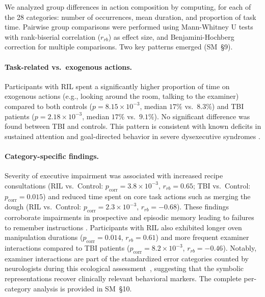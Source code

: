 \documentclass[runningheads]{llncs}
\begin{document}
    We analyzed group differences in action composition by computing, for each of the 28 categories: number of occurrences, mean duration, and proportion of task time. Pairwise group comparisons were performed using Mann-Whitney U tests with rank-biserial correlation ($r_{rb}$) as effect size, and Benjamini-Hochberg correction for multiple comparisons. Two key patterns emerged (SM~\S9).

    \paragraph{Task-related vs.\ exogenous actions.} Participants with RIL spent a significantly higher proportion of time on exogenous actions (e.g., looking around the room, talking to the examiner) compared to both controls ($p=8.15\times10^{-3}$, median $17\%$ vs.\ $8.3\%$) and TBI patients ($p=2.18\times10^{-3}$, median $17\%$ vs.\ $9.1\%$). No significant difference was found between TBI and controls. This pattern is consistent with known deficits in sustained attention and goal-directed behavior in severe dysexecutive syndromes \cite{Hendry2016sh}.

    \paragraph{Category-specific findings.} Severity of executive impairment was associated with increased recipe consultations (RIL vs.\ Control: $p_{\text{corr}}=3.8\times10^{-3}$, $r_{rb}=0.65$; TBI vs.\ Control: $p_{\text{corr}}=0.015$) and reduced time spent on core task actions such as merging the dough (RIL vs.\ Control: $p_{\text{corr}}=2.3\times10^{-3}$, $r_{rb}=-0.68$). These findings corroborate impairments in prospective and episodic memory leading to failures to remember instructions \cite{Hendry2016sh,Chevignard2008}. Participants with RIL also exhibited longer oven manipulation durations ($p_{\text{corr}}=0.014$, $r_{rb}=0.61$) and more frequent examiner interactions compared to TBI patients ($p_{\text{corr}}=8.2\times10^{-3}$, $r_{rb}=-0.46$). Notably, examiner interactions are part of the standardized error categories counted by neurologists during this ecological assessment~\cite{Chevignard2008}, suggesting that the symbolic representations recover clinically relevant behavioral markers. The complete per-category analysis is provided in SM~\S10.

\end{document}
